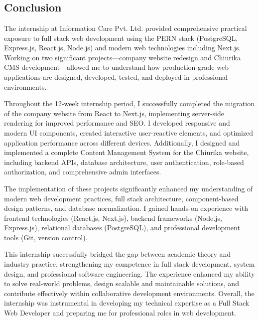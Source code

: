 \section*{\Large{}}
\label{4}

\subsection{Conclusion}

The internship at Information Care Pvt. Ltd. provided comprehensive practical exposure to full stack web development using the PERN stack (PostgreSQL, Express.js, React.js, Node.js) and modern web technologies including Next.js. Working on two significant projects—company website redesign and Chiurika CMS development—allowed me to understand how production-grade web applications are designed, developed, tested, and deployed in professional environments.

Throughout the 12-week internship period, I successfully completed the migration of the company website from React to Next.js, implementing server-side rendering for improved performance and SEO. I developed responsive and modern UI components, created interactive user-reactive elements, and optimized application performance across different devices. Additionally, I designed and implemented a complete Content Management System for the Chiurika website, including backend APIs, database architecture, user authentication, role-based authorization, and comprehensive admin interfaces.

The implementation of these projects significantly enhanced my understanding of modern web development practices, full stack architecture, component-based design patterns, and database normalization. I gained hands-on experience with frontend technologies (React.js, Next.js), backend frameworks (Node.js, Express.js), relational databases (PostgreSQL), and professional development tools (Git, version control).

This internship successfully bridged the gap between academic theory and industry practice, strengthening my competence in full stack development, system design, and professional software engineering. The experience enhanced my ability to solve real-world problems, design scalable and maintainable solutions, and contribute effectively within collaborative development environments. Overall, the internship was instrumental in developing my technical expertise as a Full Stack Web Developer and preparing me for professional roles in web development.

